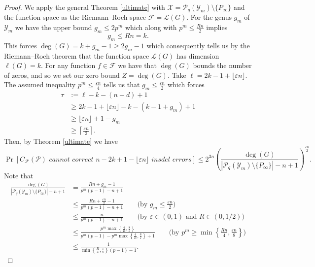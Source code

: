 \documentclass[draft, onecolumn, 11pt]{IEEEtran}
\begin{document}
\begin{proof}
    We apply the general Theorem \ref{ultimate} with $\mathcal{X} = \mathcal{P}_q(\mathcal{Y}_m) \setminus \{P_\infty\}$ and the function space as the Riemann--Roch space $\mathcal{F} =\mathcal{L}(G)$.
    For the genus $g_m$ of $\mathcal{Y}_m$ we have the upper bound $g_m \leq 2p^m$ which along with $p^m \leq \frac{Rn}{2}$ implies $$g_m \leq Rn = k. $$
    This forces $\deg(G) = k + g_m - 1 \geq 2g_m - 1$ which consequently tells us by the Riemann--Roch theorem that the function space $\mathcal{L}(G)$ has dimension $\ell(G) = k$. 
    For any function $f \in \mathcal{F}$ we have that $\deg(G)$ bounds the number of zeros, and so we set our zero bound $Z = \deg(G)$. 
    Take $\ell = 2k - 1 + \lfloor \varepsilon n \rfloor$. The assumed inequality $p^m \leq \frac{\varepsilon n}{4}$ tells us that $g_m \leq \frac{\varepsilon n}{2}$ which forces 
    \begin{align*}
        \tau &:= \ell - k - (n-d) + 1 \\
        & \geq 2k - 1 + \lfloor \varepsilon n \rfloor - k - (k-1+g_m) + 1 \\
        & \geq  \lfloor \varepsilon n \rfloor + 1 - g_m \\
        & \geq \left\lceil\frac{\varepsilon n}{2} \right\rceil .
    \end{align*}
    Then, by Theorem \ref{ultimate} we have 
    $$\Pr[C_{\mathcal{F}}(\mathcal{P}) \textit{ cannot correct $n-2k + 1 - \lfloor \varepsilon n \rfloor$ insdel errors}] \leq 2^{3n}\left(\frac{\deg(G)}{|\mathcal{P}_q(\mathcal{Y}_m) \setminus \{P_\infty\}| - n + 1}\right)^{\frac{\varepsilon n}{2}}.$$
    Note that
    \begin{align*}
        \frac{\deg(G)}{|\mathcal{P}_q(\mathcal{Y}_m) \setminus \{P_\infty\}| - n + 1} &= \frac{Rn + g_m - 1}{p^m(p-1) - n + 1} \\
        & \leq \frac{Rn + \frac{\varepsilon n}{2}  - 1}{p^m(p-1) - n + 1} \qquad \text{(by $g_m \leq \frac{\varepsilon n}{2}$)}\\
        & \leq \frac{n}{p^m(p-1) - n + 1} \qquad \text{(by $\varepsilon \in (0,1)$ and $R \in (0, 1/2)$)}\\
        & \leq \frac{p^m \max\left\lbrace \frac{4}{R}, \frac{8}{\varepsilon}\right\rbrace}{p^m(p-1)- p^m\max\left\lbrace \frac{4}{R}, \frac{8}{\varepsilon}\right\rbrace + 1} \qquad \text{(by $p^m \geq \min\left\lbrace \frac{Rn}{4}, \frac{\varepsilon n}{8}\right\rbrace$)} \\
        & \leq \frac{1}{\min\left\lbrace \frac{R}{4}, \frac{\varepsilon}{8}\right\rbrace(p-1)-1}. 

\end{align*}
\end{proof}
\end{document}
